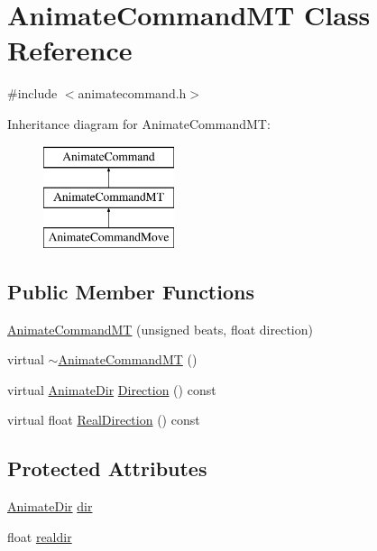 \hypertarget{a00005}{\section{Animate\-Command\-M\-T Class Reference}
\label{a00005}
}


{\ttfamily \#include $<$animatecommand.\-h$>$}

Inheritance diagram for Animate\-Command\-M\-T\-:\begin{figure}[H]
\begin{center}
\leavevmode
\includegraphics[height=3.000000cm]{a00005}
\end{center}
\end{figure}
\subsection*{Public Member Functions}
\begin{DoxyCompactItemize}
\item 
\hyperlink{a00005_ab1232dfcaf64d3d2aad184025fee20f0}{Animate\-Command\-M\-T} (unsigned beats, float direction)
\item 
virtual \hyperlink{a00005_acac75714a87676b065d6d2018783d540}{$\sim$\-Animate\-Command\-M\-T} ()
\item 
virtual \hyperlink{a00196_a6feaf30c8830fe6fcc0982cb7e9621ab}{Animate\-Dir} \hyperlink{a00005_a0f746d2dce20a8159f4534e555079501}{Direction} () const 
\item 
virtual float \hyperlink{a00005_a09339d867d2968b5db48faf0f9cc4891}{Real\-Direction} () const 
\end{DoxyCompactItemize}
\subsection*{Protected Attributes}
\begin{DoxyCompactItemize}
\item 
\hyperlink{a00196_a6feaf30c8830fe6fcc0982cb7e9621ab}{Animate\-Dir} \hyperlink{a00005_a206ae9756a75955c6ce573c5786bd238}{dir}
\item 
float \hyperlink{a00005_a183ee462c47adaabcdfb5391c68e3adf}{realdir}
\end{DoxyCompactItemize}



